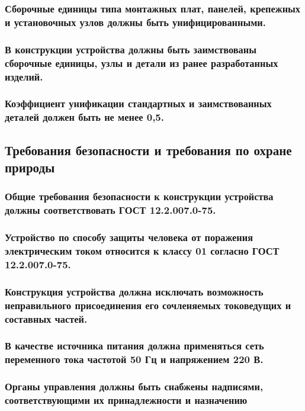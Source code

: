 \documentclass[a4paper]{bsuir-tor}
\begin{document}
\subsubsection{Сборочные единицы типа монтажных плат,
  панелей, крепежных и установочных узлов должны быть унифицированными.}

\subsubsection{В конструкции устройства должны быть заимствованы
  сборочные единицы, узлы и детали из ранее разработанных изделий.}

\subsubsection{ Коэффициент унификации стандартных и заимствованных
  деталей должен быть не менее 0,5.}

\subsection{Требования безопасности и
  требования по охране природы}

\subsubsection{Общие требования безопасности к конструкции устройства
  должны соответствовать ГОСТ 12.2.007.0-75.}

\subsubsection{Устройство по способу защиты человека от поражения
  электрическим током относится к классу 01 согласно ГОСТ 12.2.007.0-75.}

\subsubsection{Конструкция устройства должна исключать
  возможность неправильного присоединения
  его сочленяемых токоведущих и составных частей.}

\subsubsection{В качестве источника питания должна применяться
  сеть переменного тока частотой 50 Гц и напряжением 220 В.}

\subsubsection{Органы управления должны быть снабжены надписями,
  соответствующими их принадлежности и назначению}
\end{document}
